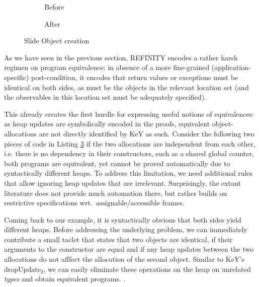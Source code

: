 \newcommand\relevant{$\mathrm{relevant}$}
\newcommand\assignable{$\mathrm{assignable}$}
\newcommand\accessible{$\mathrm{accessible}$}
\newcommand\keyrule[1]{\ensuremath{\mathrm{#1}}}

\begin{figure}
  \begin{subfigure}[h]{.45\linewidth}
    
    \caption{Before}
    \label{lst:ObjectCreation-refinity-before}    
  \end{subfigure}\hspace{1cm}
  \begin{subfigure}[h]{.45\linewidth}
    
    \caption{After}
    \label{lst:ObjectCreation-refinity-after}
  \end{subfigure}
  \caption{Slide Object creation}
  \label{lst:ObjectCreation-refinity}
\end{figure}

As we have seen in the previous section, REFINITY encodes a rather harsh regimen on program equivalence:
in absence of a more fine-grained (application-specific) post-condition, it encodes that return values or exceptions must be identical on both sides,
as must be the objects in the \relevant{} location set (and the observables in this location set must be adequately specified).

This already creates the first hurdle for expressing useful notions of equivalences: as heap updates are symbolically encoded in the proofs, equivalent object-allocations are not directly identified by KeY as such.
Consider the following two pieces of code in Listing \ref{lst:ObjectCreation-refinity}
if the two allocations are independent from each other, i.e. there is no dependency in their constructors, such as a shared global counter,
both programs are equivalent, yet cannot be proved automatically due to syntactically different heaps.
To address this limitation, we need additional rules that allow ignoring heap updates that are irrelevant.
Surprisingly, the extant literature does not provide much automation there, but rather builds on restrictive specifications wrt.\ \assignable{}/\accessible{} frames.

Coming back to our example, it is syntactically obvious that both sides yield different heaps.
Before addressing the underlying problem, 
we can immediately contribute a small taclet that states that two objects are identical, if their arguments to the constructor are equal and if any heap updates between the two allocations do not afffect the allocation of the second object.
Similar to KeY's \keyrule{dropUpdate_2}, we can easily eliminate these operations on the heap on unrelated \textit{types} and obtain equivalent programs.
.

